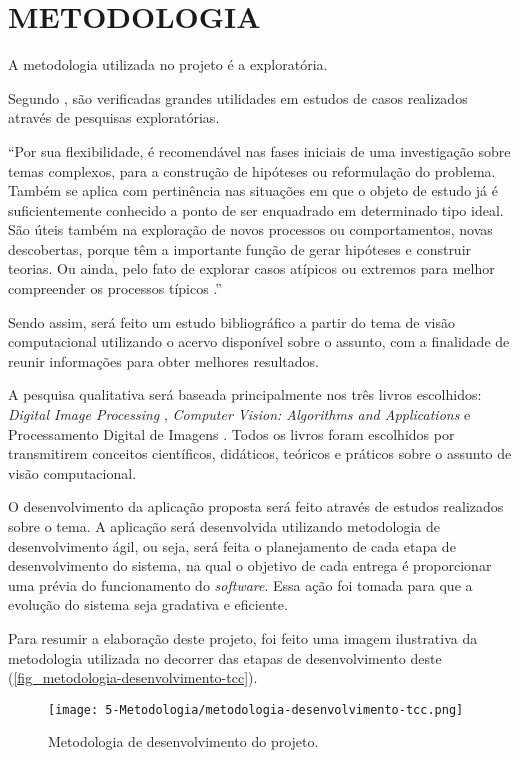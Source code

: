 \chapter{\textbf{METODOLOGIA}}
\label{metodologia}

A metodologia utilizada no projeto é a exploratória.

Segundo , são verificadas grandes utilidades em estudos de casos realizados através de pesquisas exploratórias.

\begin{citacao}
“Por sua flexibilidade, é recomendável nas fases iniciais de uma investigação sobre temas complexos, para a construção de hipóteses ou reformulação do problema. Também se aplica com pertinência nas situações em que o objeto de estudo já é suficientemente conhecido a ponto de ser enquadrado em determinado tipo ideal. São úteis também na exploração de novos processos ou comportamentos, novas descobertas, porque têm a importante função de gerar hipóteses e construir teorias. Ou ainda, pelo fato de explorar casos atípicos ou extremos para melhor compreender os processos típicos \cite{VENTURA2007}.”
\end{citacao}

Sendo assim, será feito um estudo bibliográfico a partir do tema de visão computacional utilizando o acervo disponível sobre o assunto, com a finalidade de reunir informações para obter melhores resultados.

A pesquisa qualitativa será baseada principalmente nos três livros escolhidos: \textit{Digital Image Processing} \cite{GONZALEZ2002},  \textit{Computer Vision: Algorithms and Applications} \cite{SZELISKI2010} e Processamento Digital de Imagens \cite{FILHO1999}. Todos os livros foram escolhidos por transmitirem conceitos científicos, didáticos, teóricos e práticos sobre o assunto de visão computacional.

O desenvolvimento da aplicação proposta será feito através de estudos realizados sobre o tema. A aplicação será desenvolvida utilizando metodologia de desenvolvimento ágil, ou seja, será feita o planejamento de cada etapa de desenvolvimento do sistema, na qual o objetivo de cada entrega é proporcionar uma prévia do funcionamento do \textit{software}. Essa ação foi tomada para que a evolução do sistema seja gradativa e eficiente.

Para resumir a elaboração deste projeto, foi feito uma imagem ilustrativa da metodologia utilizada no decorrer das etapas de desenvolvimento deste (\autoref{fig_metodologia-desenvolvimento-tcc}).

\begin{figure}[h]
	\caption{\label{fig_metodologia-desenvolvimento-tcc}Metodologia de desenvolvimento do projeto.}
	\begin{center}
		\texttt{[image: 5-Metodologia/metodologia-desenvolvimento-tcc.png]}
	\end{center}
	\centering {}
\end{figure}